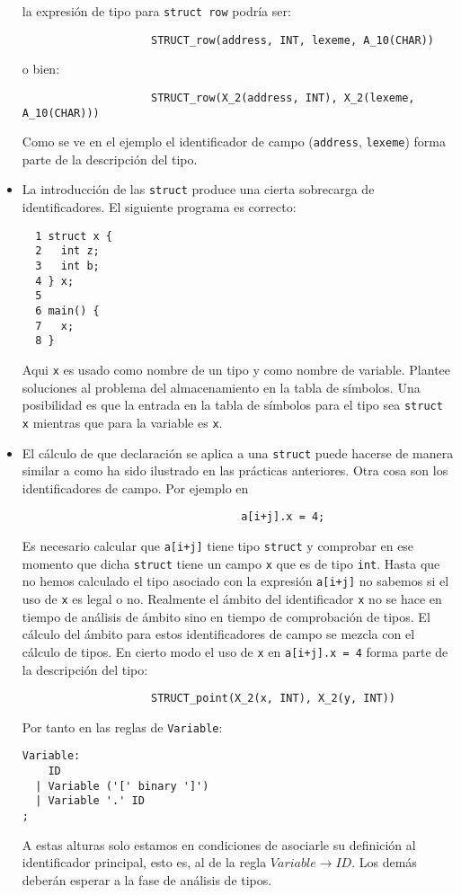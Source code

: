 \begin{itemize}
la expresión de tipo para \verb|struct row| podría ser:

\begin{verbatim}
                    STRUCT_row(address, INT, lexeme, A_10(CHAR))
\end{verbatim}
o bien:
\begin{verbatim}
                    STRUCT_row(X_2(address, INT), X_2(lexeme, A_10(CHAR)))
\end{verbatim}

Como se ve en el ejemplo el identificador de campo (\verb|address|, \verb|lexeme|)
forma parte de la descripción del tipo.

\item
La introducción de las \verb|struct| produce una cierta sobrecarga de identificadores.
El siguiente programa es correcto:
\begin{verbatim}
  1 struct x {
  2   int z;
  3   int b;
  4 } x;
  5
  6 main() {
  7   x;
  8 }
\end{verbatim}
Aqui \verb|x| es usado como nombre de un tipo y como nombre de variable. Plantee soluciones
al problema del almacenamiento en la tabla de símbolos. Una posibilidad es que la entrada
en la tabla de símbolos para el tipo sea \verb|struct x| mientras que para la variable es \verb|x|. 

\item
El cálculo de que declaración se aplica a una \verb|struct| 
puede hacerse de manera similar a como ha sido ilustrado en las prácticas anteriores.
Otra cosa son los identificadores de campo.
Por ejemplo en
\begin{verbatim}
                                  a[i+j].x = 4;
\end{verbatim}
Es necesario calcular que \verb|a[i+j]| tiene tipo  \verb|struct|
y comprobar en ese momento que dicha  \verb|struct|
tiene un campo \verb|x| que es de tipo \verb|int|. 
Hasta que no hemos calculado el tipo asociado con la 
expresión  \verb|a[i+j]| no sabemos si el uso de
\verb|x| es legal o no. Realmente el ámbito del identificador \verb|x| no 
se hace en tiempo de análisis de ámbito sino en tiempo de comprobación de tipos.
El cálculo del ámbito para estos identificadores de campo 
se mezcla con el cálculo de tipos. En cierto modo el uso de \verb|x| 
en \verb|a[i+j].x = 4| forma parte de la descripción del tipo:
\begin{verbatim}
                    STRUCT_point(X_2(x, INT), X_2(y, INT))
\end{verbatim}
Por tanto en las reglas de \verb|Variable|:
\begin{verbatim}
Variable:
    ID 
  | Variable ('[' binary ']') 
  | Variable '.' ID
;
\end{verbatim}
A estas alturas solo estamos en condiciones de asociarle su definición al 
identificador principal, esto es, al de la regla $Variable \rightarrow ID$.
Los demás deberán esperar a la fase de análisis de tipos.


\end{itemize}
